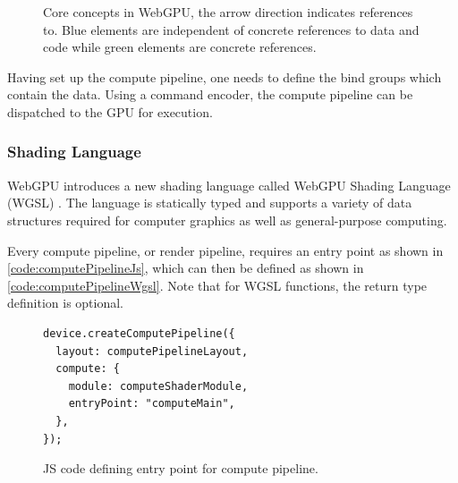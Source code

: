 \begin{figure}[H]
  \centering
  \caption{Core concepts in WebGPU, the arrow direction indicates references to. Blue elements are independent of concrete references to data and code while green elements are concrete references.}
  \label{fig:webgpu-arch}
\end{figure}

Having set up the compute pipeline, one needs to define the bind groups which contain the data. Using a command encoder, the compute pipeline can be dispatched to the \gls{GPU} for execution.

\subsubsection{Shading Language}

\gls{WebGPU} introduces a new shading language called \gls{WebGPU} Shading Language (\gls{WGSL}) \cite{wgslSpecification}. The language is statically typed and supports a variety of data structures required for computer graphics as well as general-purpose computing.

Every compute pipeline, or render pipeline, requires an entry point as shown in \autoref{code:computePipelineJs}, which can then be defined as shown in \autoref{code:computePipelineWgsl}. Note that for \gls{WGSL} functions, the return type definition is optional.

\begin{figure}[H]
  \begin{lstlisting}[style=JavaScript]
device.createComputePipeline({
  layout: computePipelineLayout,
  compute: {
    module: computeShaderModule,
    entryPoint: "computeMain",
  },
});
  \end{lstlisting}
  \caption{JS code defining entry point for compute pipeline.}
  \label{code:computePipelineJs}
\end{figure}

